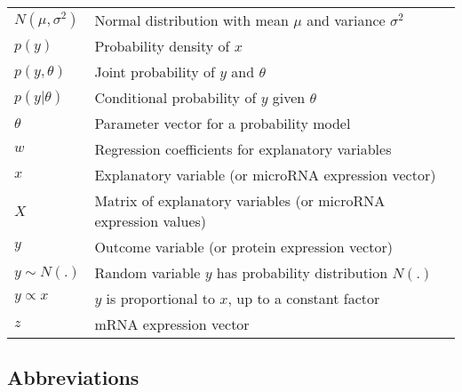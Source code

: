 \documentclass[english,12pt,a4paper,pdftex,elec,utf8]{aaltothesis}
\begin{document}
\begin{tabular}{ll}
$N(\mu,\sigma^2)$ & Normal distribution with mean $\mu$ and variance $\sigma^2$ \\
$p(y)$            & Probability density of $x$ \\
$p(y,\theta)$     & Joint probability of $y$ and $\theta$ \\
$p(y|\theta)$     & Conditional probability of $y$ given $\theta$ \\
$\theta$          & Parameter vector for a probability model \\
$w$               & Regression coefficients for explanatory variables \\
$x$               & Explanatory variable (or microRNA expression vector) \\
$X$               & Matrix of explanatory variables (or microRNA expression values) \\
$y$               & Outcome variable (or protein expression vector) \\
$y \sim N(.)$     & Random variable $y$ has probability distribution $N(.)$ \\
$y \propto x$     & $y$ is proportional to $x$, up to a constant factor \\
$z$               & mRNA expression vector
\end{tabular}


\subsection*{Abbreviations}
\end{document}
